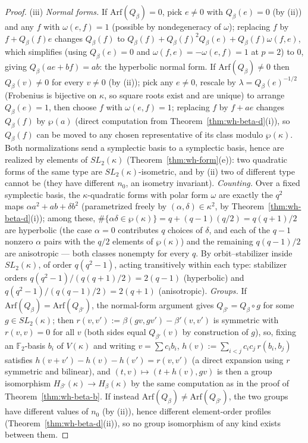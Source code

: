 \begin{proof}
(iii) \emph{Normal forms.} If $\mathrm{Arf}(Q_\beta)=0$, pick $e\neq 0$ with
$Q_\beta(e)=0$ (by (ii)) and any $f$ with $\omega(e,f)=1$ (possible by
nondegeneracy of $\omega$); replacing $f$ by $f+Q_\beta(f)e$ changes
$Q_\beta(f)$ to $Q_\beta(f)+Q_\beta(f)^2Q_\beta(e) + Q_\beta(f)\omega(f,e)$, which
simplifies (using $Q_\beta(e)=0$ and $\omega(f,e)=-\omega(e,f)=1$ at $p=2$)
to $0$, giving $Q_\beta(ae+bf)=ab$: the hyperbolic normal form. If
$\mathrm{Arf}(Q_\beta)\neq 0$ then $Q_\beta(v)\neq 0$ for every $v\neq 0$ (by
(ii)); pick any $e\neq 0$, rescale by $\lambda=Q_\beta(e)^{-1/2}$ (Frobenius
is bijective on $\kappa$, so square roots exist and are unique) to arrange
$Q_\beta(e)=1$, then choose $f$ with $\omega(e,f)=1$; replacing $f$ by $f+ae$
changes $Q_\beta(f)$ by $\wp(a)$ (direct computation from
Theorem~\ref{thm:wh-beta-d}(i)), so $Q_\beta(f)$ can be moved to any chosen
representative of its class modulo $\wp(\kappa)$. Both normalizations send a
symplectic basis to a symplectic basis, hence are realized by elements of
$SL_2(\kappa)$ (Theorem~\ref{thm:wh-form}(e)): two quadratic forms of the
same type are $SL_2(\kappa)$-isometric, and by (ii) two of different type
cannot be (they have different $n_0$, an isometry invariant). \emph{Counting.}
Over a fixed symplectic basis, the $\kappa$-quadratic forms with polar form
$\omega$ are exactly the $q^2$ maps $\alpha a^2+ab+\delta b^2$
(parametrized freely by $(\alpha,\delta)\in\kappa^2$, by
Theorem~\ref{thm:wh-beta-d}(i)); among these,
$\#\{\alpha\delta\in\wp(\kappa)\} = q + (q-1)(q/2) = q(q+1)/2$ are
hyperbolic (the case $\alpha=0$ contributes $q$ choices of $\delta$, and each
of the $q-1$ nonzero $\alpha$ pairs with the $q/2$ elements of $\wp(\kappa)$)
and the remaining $q(q-1)/2$ are anisotropic — both classes nonempty for
every $q$. By orbit--stabilizer inside $SL_2(\kappa)$, of order
$q(q^2-1)$, acting transitively within each type: stabilizer orders
$q(q^2-1)/(q(q+1)/2) = 2(q-1)$ (hyperbolic) and
$q(q^2-1)/(q(q-1)/2)=2(q+1)$ (anisotropic). \emph{Groups.} If
$\mathrm{Arf}(Q_\beta)=\mathrm{Arf}(Q_{\beta'})$, the normal-form argument
gives $Q_{\beta'}=Q_\beta\circ g$ for some $g\in SL_2(\kappa)$; then
$r(v,v'):=\beta(gv,gv')-\beta'(v,v')$ is symmetric with $r(v,v)=0$ for all
$v$ (both sides equal $Q_{\beta'}(v)$ by construction of $g$), so, fixing an
$\mathbb{F}_2$-basis $b_i$ of $V(\kappa)$ and writing $v=\sum c_ib_i$,
$h(v):=\sum_{i<j}c_ic_j\,r(b_i,b_j)$ satisfies
$h(v+v')-h(v)-h(v')=r(v,v')$ (a direct expansion using $r$ symmetric and
bilinear), and $(t,v)\mapsto(t+h(v),gv)$ is then a group isomorphism
$H_{\beta'}(\kappa)\to H_\beta(\kappa)$ by the same computation as in the
proof of Theorem~\ref{thm:wh-beta-b}. If instead
$\mathrm{Arf}(Q_\beta)\neq\mathrm{Arf}(Q_{\beta'})$, the two groups have
different values of $n_0$ (by (ii)), hence different element-order profiles
(Theorem~\ref{thm:wh-beta-d}(ii)), so no group isomorphism of any kind
exists between them.
\end{proof}

